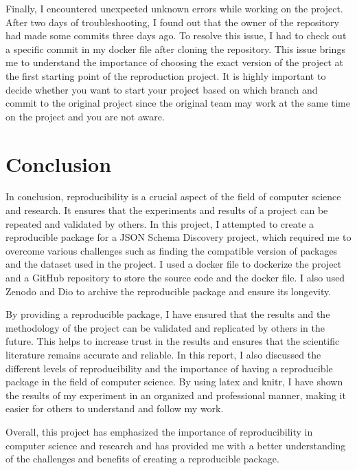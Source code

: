 \documentclass[sigconf]{acmart}
\begin{document}
Finally, I encountered unexpected unknown errors while working on the project. After two days of troubleshooting, I found out that the owner of the repository had made some commits three days ago. To resolve this issue, I had to check out a specific commit in my docker file after cloning the repository. This issue brings me to understand the importance of choosing the exact version of the project at the first starting point of the reproduction project. It is highly important to decide whether you want to start your project based on which branch and commit to the original project since the original team may work at the same time on the project and you are not aware.

\section{Conclusion}

In conclusion, reproducibility is a crucial aspect of the field of computer science and research. It ensures that the experiments and results of a project can be repeated and validated by others. In this project, I attempted to create a reproducible package for a JSON Schema Discovery project, which required me to overcome various challenges such as finding the compatible version of packages and the dataset used in the project.
I used a docker file to dockerize the project and a GitHub repository to store the source code and the docker file. I also used Zenodo and Dio to archive the reproducible package and ensure its longevity.

By providing a reproducible package, I have ensured that the results and the methodology of the project can be validated and replicated by others in the future. This helps to increase trust in the results and ensures that the scientific literature remains accurate and reliable.
In this report, I also discussed the different levels of reproducibility and the importance of having a reproducible package in the field of computer science. By using latex and knitr, I have shown the results of my experiment in an organized and professional manner, making it easier for others to understand and follow my work.

Overall, this project has emphasized the importance of reproducibility in computer science and research and has provided me with a better understanding of the challenges and benefits of creating a reproducible package.




\appendix
\end{document}
